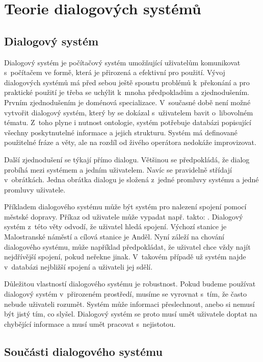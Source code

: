 \chapter{Teorie dialogových systémů}
\label{ch:kap1}

\section{Dialogový systém}

Dialogový systém je počítačový systém umožňující uživatelům komunikovat s~počítačem ve formě, která je přirozená a efektivní pro použití.
Vývoj dialogových systémů má před sebou ještě spoustu problémů k~překonání a pro praktické použití je třeba se uchýlit k~mnoha předpokladům a zjednodušením.
Prvním zjednodušením je doménová specializace.
V~současné době není možné vytvořit dialogový systém, který by se dokázal s~uživatelem bavit o~libovolném tématu.
Z~toho plyne i nutnost ontologie, systém potřebuje databázi popisující všechny poskytnutelné informace a jejich strukturu.
Systém má definované použitelné fráze a věty, ale na rozdíl od živého operátora nedokáže improvizovat.

Další zjednodušení se týkají přímo dialogu.
Většinou se předpokládá, že dialog probíhá mezi systémem a jedním uživatelem.
Navíc se pravidelně střídají v~obrátkách.
Jedna obrátka dialogu je složená z~jedné promluvy systému a jedné promluvy uživatele.

Příkladem dialogového systému může být systém pro nalezení spojení pomocí městské dopravy.
Příkaz od uživatele může vypadat např. takto: .
Dialogový systém z~této věty odvodí, že uživatel hledá spojení. 
Výchozí stanice je Malostranské náměstí a cílová stanice je Anděl.
Nyní záleží na chování dialogového systému, může například předpokládat, že uživatel chce vždy najít nejdřívější spojení, pokud neřekne jinak.
V~takovém případě už systém najde v~databázi nejbližší spojení a uživateli jej sdělí.

Důležitou vlastností dialogového systému je robustnost.
Pokud budeme používat dialogový systém v~přirozeném prostředí, musíme se vyrovnat s~tím, že často nebude uživateli rozumět.
Systém může informaci přeslechnout, anebo si nemusí být jistý tím, co slyšel.
Dialogový systém se proto musí umět uživatele doptat na chybějící informace a musí umět pracovat s~nejistotou.

\section{Součásti dialogového systému}

